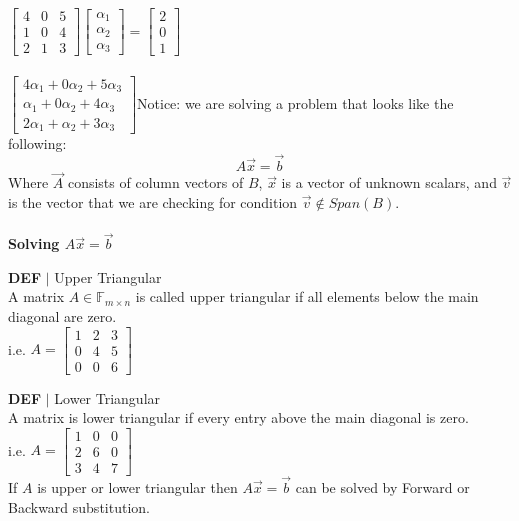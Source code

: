 \documentclass [12pt]{article}
\begin{document}
$\begin{bmatrix}
4&0&5\\
1&0&4\\
2&1&3
\end{bmatrix}\begin{bmatrix}
\alpha_1\\
\alpha_2\\
\alpha_3
\end{bmatrix}=\begin{bmatrix}
2\\
0\\
1
\end{bmatrix}$\\\\
$\begin{bmatrix}
4\alpha_1+0\alpha_2+5\alpha_3\\
\alpha_1+0\alpha_2+4\alpha_3\\
2\alpha_1+\alpha_2+3\alpha_3
\end{bmatrix}$\indent Notice: we are solving a problem that looks like the following: 
\[A\overrightarrow{x}=\overrightarrow{b}\]
Where $\overrightarrow{A}$ consists of column vectors of $B$, $\overrightarrow{x}$ is a vector of unknown scalars, and $\overrightarrow{v}$ is the vector that we are checking for condition $\overrightarrow{v}\notin Span(B)$.\\\\
\noindent\textbf{Solving $A\overrightarrow{x}=\overrightarrow{b}$}
\begin{framed}
\noindent\textbf{DEF} $|$ Upper Triangular\\
A matrix $A\in\mathbb{F}_{m\times n}$ is called upper triangular if all elements below the main diagonal are zero. \\
i.e. $A=\begin{bmatrix}
1&2&3\\
0&4&5\\
0&0&6
\end{bmatrix}$
\end{framed}
\begin{framed}
\noindent\textbf{DEF} $|$ Lower Triangular\\
A matrix is lower triangular if every entry above the main diagonal is zero.\\
i.e. $A=\begin{bmatrix}
1&0&0\\
2&6&0\\
3&4&7
\end{bmatrix}$\\
If $A$ is upper or lower triangular then $A\overrightarrow{x}=\overrightarrow{b}$ can be solved by Forward or Backward substitution.
\end{framed}
\end{document}
